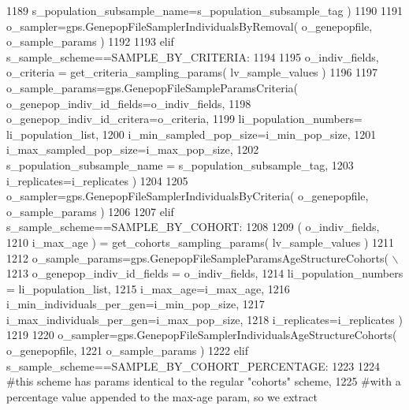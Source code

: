 \begin{DoxyCode}
1189                                                 s\_population\_subsample\_name=s\_population\_subsample\_tag )
1190 
1191         o\_sampler=gps.GenepopFileSamplerIndividualsByRemoval( o\_genepopfile, o\_sample\_params )
1192 
1193     \textcolor{keywordflow}{elif} s\_sample\_scheme==SAMPLE\_BY\_CRITERIA:
1194 
1195         o\_indiv\_fields, o\_criteria = get\_criteria\_sampling\_params( lv\_sample\_values )
1196 
1197         o\_sample\_params=gps.GenepopFileSampleParamsCriteria( o\_genepop\_indiv\_id\_fields=o\_indiv\_fields,
1198                                                                     o\_genepop\_indiv\_id\_critera=o\_criteria,
1199                                                                     li\_population\_numbers=
      li\_population\_list,
1200                                                                     i\_min\_sampled\_pop\_size=i\_min\_pop\_size,
1201                                                                     i\_max\_sampled\_pop\_size=i\_max\_pop\_size,
1202                                                                     s\_population\_subsample\_name = 
      s\_population\_subsample\_tag,
1203                                                                     i\_replicates=i\_replicates )
1204 
1205         o\_sampler=gps.GenepopFileSamplerIndividualsByCriteria( o\_genepopfile, o\_sample\_params )
1206 
1207     \textcolor{keywordflow}{elif} s\_sample\_scheme==SAMPLE\_BY\_COHORT:
1208 
1209         ( o\_indiv\_fields,
1210             i\_max\_age ) = get\_cohorts\_sampling\_params( lv\_sample\_values )
1211 
1212         o\_sample\_params=gps.GenepopFileSampleParamsAgeStructureCohorts( \(\backslash\)
1213                                         o\_genepop\_indiv\_id\_fields = o\_indiv\_fields,
1214                                         li\_population\_numbers = li\_population\_list,
1215                                         i\_max\_age=i\_max\_age,
1216                                         i\_min\_individuals\_per\_gen=i\_min\_pop\_size,
1217                                         i\_max\_individuals\_per\_gen=i\_max\_pop\_size,
1218                                         i\_replicates=i\_replicates )
1219 
1220         o\_sampler=gps.GenepopFileSamplerIndividualsAgeStructureCohorts( o\_genepopfile,
1221                                                                     o\_sample\_params )
1222     \textcolor{keywordflow}{elif} s\_sample\_scheme==SAMPLE\_BY\_COHORT\_PERCENTAGE:
1223 
1224         \textcolor{comment}{#this scheme has params identical to the regular "cohorts" scheme,}
1225         \textcolor{comment}{#with a percentage value appended to the max-age param, so we extract}

\end{DoxyCode}
